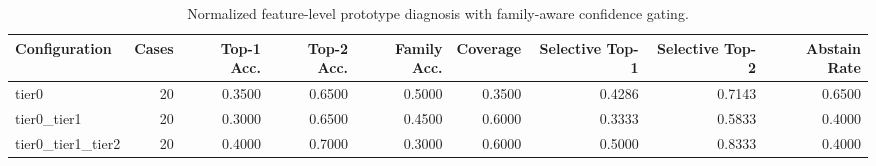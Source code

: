 \begin{table}[t]
\centering
\caption{Normalized feature-level prototype diagnosis with family-aware confidence gating.}
\label{tab:dice_stressor_hierarchical_diagnosis}
\footnotesize
\begin{tabular}{lrrrrrrrr}
\toprule
Configuration & Cases & Top-1 Acc. & Top-2 Acc. & Family Acc. & Coverage & Selective Top-1 & Selective Top-2 & Abstain Rate \\
\midrule
tier0 & 20 & 0.3500 & 0.6500 & 0.5000 & 0.3500 & 0.4286 & 0.7143 & 0.6500 \\
tier0_tier1 & 20 & 0.3000 & 0.6500 & 0.4500 & 0.6000 & 0.3333 & 0.5833 & 0.4000 \\
tier0_tier1_tier2 & 20 & 0.4000 & 0.7000 & 0.3000 & 0.6000 & 0.5000 & 0.8333 & 0.4000 \\
\bottomrule
\end{tabular}

\end{table}
